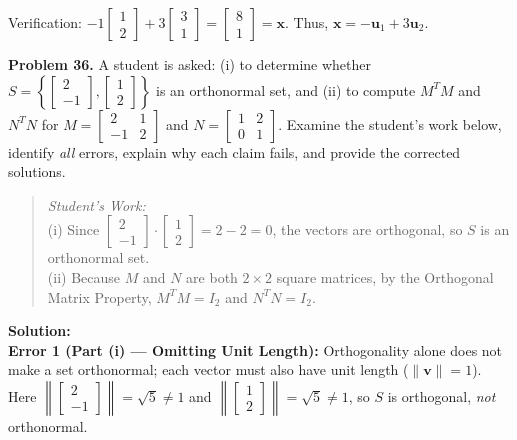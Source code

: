 \documentclass[11pt, letterpaper]{article}
\theoremstyle{definition}
\theoremstyle{remark}
\begin{document}
Verification: $-1\begin{bmatrix} 1 \\ 2 \end{bmatrix} + 3\begin{bmatrix} 3 \\ 1 \end{bmatrix} = \begin{bmatrix} 8 \\ 1 \end{bmatrix} = \mathbf{x}$. Thus, $\mathbf{x} = -\mathbf{u}_1 + 3\mathbf{u}_2$.

\textbf{Problem 36.} A student is asked: (i) to determine whether $S = \left\{\begin{bmatrix} 2 \\ -1 \end{bmatrix}, \begin{bmatrix} 1 \\ 2 \end{bmatrix}\right\}$ is an orthonormal set, and (ii) to compute $M^T M$ and $N^T N$ for $M = \begin{bmatrix} 2 & 1 \\ -1 & 2 \end{bmatrix}$ and $N = \begin{bmatrix} 1 & 2 \\ 0 & 1 \end{bmatrix}$. Examine the student's work below, identify \textit{all} errors, explain why each claim fails, and provide the corrected solutions.
\begin{quote}
\textit{Student's Work:} \\
(i) Since $\begin{bmatrix} 2 \\ -1 \end{bmatrix} \cdot \begin{bmatrix} 1 \\ 2 \end{bmatrix} = 2 - 2 = 0$, the vectors are orthogonal, so $S$ is an orthonormal set. \\
(ii) Because $M$ and $N$ are both $2 \times 2$ square matrices, by the Orthogonal Matrix Property, $M^T M = I_2$ and $N^T N = I_2$.
\end{quote}
\textbf{Solution:} \\
\textbf{Error 1 (Part (i) --- Omitting Unit Length):} Orthogonality alone does not make a set orthonormal; each vector must also have unit length ($\|\mathbf{v}\| = 1$). Here $\left\|\begin{bmatrix} 2 \\ -1 \end{bmatrix}\right\| = \sqrt{5} \neq 1$ and $\left\|\begin{bmatrix} 1 \\ 2 \end{bmatrix}\right\| = \sqrt{5} \neq 1$, so $S$ is orthogonal, \textit{not} orthonormal. \\
\end{document}
